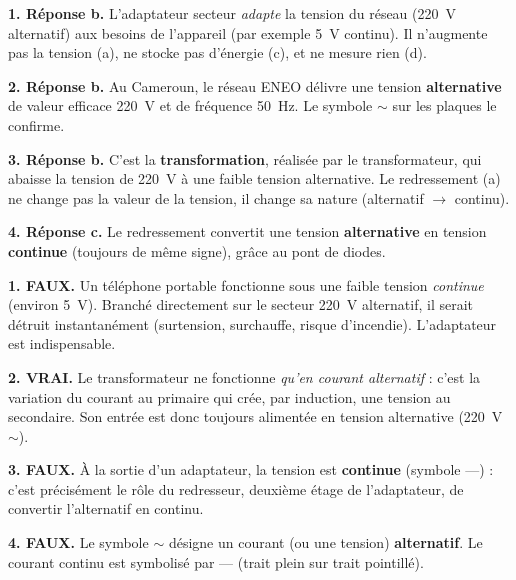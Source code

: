 \documentclass[11pt]{article}
\begin{document}
\begin{corrige}
\textbf{1. Réponse b.} L'adaptateur secteur \emph{adapte} la tension du réseau (\SI{220}{V} alternatif) aux besoins de l'appareil (par exemple \SI{5}{V} continu). Il n'augmente pas la tension (a), ne stocke pas d'énergie (c), et ne mesure rien (d).

\textbf{2. Réponse b.} Au Cameroun, le réseau ENEO délivre une tension \textbf{alternative} de valeur efficace \SI{220}{V} et de fréquence \SI{50}{Hz}. Le symbole $\sim$ sur les plaques le confirme.

\textbf{3. Réponse b.} C'est la \textbf{transformation}, réalisée par le transformateur, qui abaisse la tension de \SI{220}{V} à une faible tension alternative. Le redressement (a) ne change pas la valeur de la tension, il change sa nature (alternatif $\rightarrow$ continu).

\textbf{4. Réponse c.} Le redressement convertit une tension \textbf{alternative} en tension \textbf{continue} (toujours de même signe), grâce au pont de diodes.
\end{corrige}

\begin{corrige}
\textbf{1. FAUX.} Un téléphone portable fonctionne sous une faible tension \emph{continue} (environ \SI{5}{V}). Branché directement sur le secteur \SI{220}{V} alternatif, il serait détruit instantanément (surtension, surchauffe, risque d'incendie). L'adaptateur est indispensable.

\textbf{2. VRAI.} Le transformateur ne fonctionne \emph{qu'en courant alternatif} : c'est la variation du courant au primaire qui crée, par induction, une tension au secondaire. Son entrée est donc toujours alimentée en tension alternative (\SI{220}{V} $\sim$).

\textbf{3. FAUX.} À la sortie d'un adaptateur, la tension est \textbf{continue} (symbole $\text{---}$) : c'est précisément le rôle du redresseur, deuxième étage de l'adaptateur, de convertir l'alternatif en continu.

\textbf{4. FAUX.} Le symbole $\sim$ désigne un courant (ou une tension) \textbf{alternatif}. Le courant continu est symbolisé par $\text{---}$ (trait plein sur trait pointillé).
\end{corrige}
\end{document}
